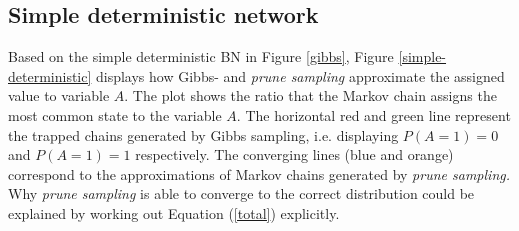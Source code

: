 \documentclass[a4paper, twoside, 11pt]{report}
\theoremstyle{plain}
\theoremstyle{definition}
\theoremstyle{remark}
\newcommand{\ps}{\textit{prune sampling }}
\newcommand{\psp}{\textit{prune sampling. }}
\begin{document}
\subsection{Simple deterministic network}
Based on the simple deterministic BN in Figure \ref{gibbs}, Figure \ref{simple-deterministic} displays how Gibbs- and \ps approximate the assigned value to variable $A$. The plot shows the ratio that the Markov chain assigns the most common state to the variable $A$. The horizontal red and green line represent the trapped chains generated by Gibbs sampling, i.e. displaying $P(A=1)=0$ and $P(A=1)=1$ respectively. The converging lines (blue and orange) correspond to the approximations of Markov chains generated by \psp \\

Why \ps is able to converge to the correct distribution could be explained by working out Equation (\ref{total}) explicitly. 
\end{document}
